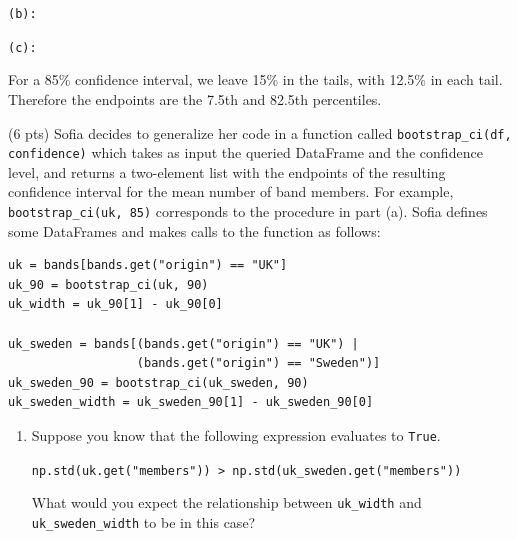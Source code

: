 \documentclass[twoside,12pt]{article}
\begin{document}
\begin{probset}
\begin{prob}[(16 pts)]
\begin{subprobset}
\begin{subprob}
\texttt{(b):} 

\smallskip
\texttt{(c):} 

\begin{soln}
For a 85\% confidence interval, we leave 15\% in the tails, with 12.5\% in each tail. Therefore the endpoints are the 7.5th and 82.5th percentiles.
\end{soln}

\end{subprob}

\bigskip

\begin{subprob}(6 pts)
Sofia decides to generalize her code in a function called \texttt{bootstrap\_ci(df, confidence)} which takes as input the queried DataFrame and the confidence level, and returns a two-element list with the endpoints of the resulting confidence interval for the mean number of band members. For example, \texttt{bootstrap\_ci(uk, 85)} corresponds to the procedure in part (a). Sofia defines some DataFrames and makes calls to the function as follows:

\bigskip

\begin{verbatim}
uk = bands[bands.get("origin") == "UK"]
uk_90 = bootstrap_ci(uk, 90)
uk_width = uk_90[1] - uk_90[0]

uk_sweden = bands[(bands.get("origin") == "UK") |
                  (bands.get("origin") == "Sweden")]
uk_sweden_90 = bootstrap_ci(uk_sweden, 90)
uk_sweden_width = uk_sweden_90[1] - uk_sweden_90[0]
\end{verbatim}

\newpage

\begin{enumerate}

    \item [(i)] Suppose you know that the following expression evaluates to \texttt{True}.

    \medskip
    
    \verb|np.std(uk.get("members")) > np.std(uk_sweden.get("members"))|

    \medskip
    
    What would you expect the relationship between \texttt{uk\_width} and \texttt{uk\_sweden\_width} to be in this case?

\medskip


\smallskip
{}


\end{enumerate}
\end{subprob}
\end{subprobset}
\end{prob}
\end{probset}
\end{document}

